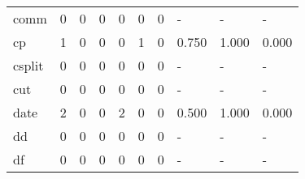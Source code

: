 \begin{longtable}{lp{1.3cm}p{1.3cm}p{1.3cm}p{1.3cm}p{1.3cm}p{1.3cm}p{1.3cm}p{1.3cm}p{1.3cm}}
comm      &                      0 &                                             0 &                                            0 &                                           0 &                                            0 &                                          0 &                                    - &                                      - &                                    - \\
cp        &                      1 &                                             0 &                                            0 &                                           0 &                                            1 &                                          0 &                                0.750 &                                  1.000 &                                0.000 \\
csplit    &                      0 &                                             0 &                                            0 &                                           0 &                                            0 &                                          0 &                                    - &                                      - &                                    - \\
cut       &                      0 &                                             0 &                                            0 &                                           0 &                                            0 &                                          0 &                                    - &                                      - &                                    - \\
date      &                      2 &                                             0 &                                            0 &                                           2 &                                            0 &                                          0 &                                0.500 &                                  1.000 &                                0.000 \\
dd        &                      0 &                                             0 &                                            0 &                                           0 &                                            0 &                                          0 &                                    - &                                      - &                                    - \\
df        &                      0 &                                             0 &                                            0 &                                           0 &                                            0 &                                          0 &                                    - &                                      - &                                    - \\

\end{longtable}
